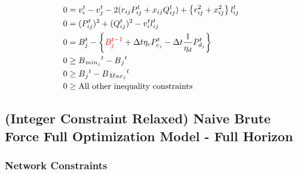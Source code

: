 \begin{gather}
\begin{align}
		{0} & = {v_{i}^t - v_{j}^t - 2(r_{ij}P_{ij}^t + x_{ij}Q_{ij}^t) + \left\{r_{ij}^2 + x_{ij}^2\right\}l_{ij}^t}  && \\
		{0} & = {(P_{ij}^{t})^2 + (Q_{ij}^{t})^2 - v_{i}^t l_{ij}^t } \\
		{0} & = {B_{j}^{t} - \left\{ \textcolor{red}{ B_{j}^{t-1} } + \Delta t  \eta_c P_{c_j}^t - \Delta t\frac{1}{\eta_d} P_{d_j}^t \right\} } \\
		{0} & \geq {B{_{min_{j}}}^t - B{_j}^t} \\
		{0} & \geq {B{_j}^t - B{_{Max_{j}}}^t} \\
		{0} & \geq {\text{All other inequality constraints}}
	\end{align}
\end{gather}

\subsection*{(Integer Constraint Relaxed) Naive Brute Force Full Optimization Model - Full Horizon}

\subsubsection*{Network Constraints}

